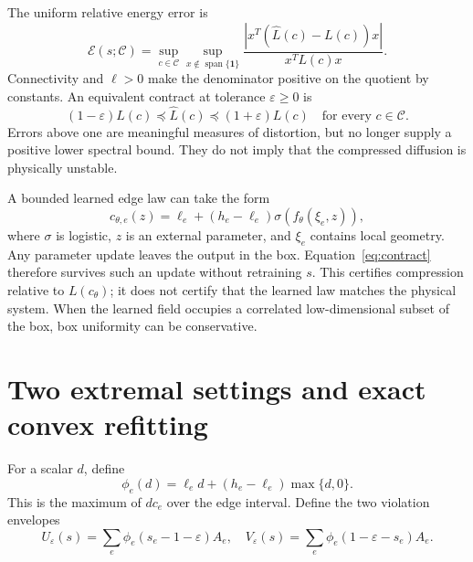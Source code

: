 \documentclass[11pt]{article}
\newcommand{\one}{\mathbf 1}
\newcommand{\eps}{\varepsilon}
\newcommand{\Lo}{\widehat L}
\begin{document}
The uniform relative energy error is
\begin{equation}\label{eq:error}
\mathcal E(s;\mathcal C)=\sup_{c\in\mathcal C}\sup_{x\notin\operatorname{span}\{\one\}}
\frac{|x^T(\Lo(c)-L(c))x|}{x^TL(c)x}.
\end{equation}
Connectivity and $\ell>0$ make the denominator positive on the quotient by constants. An equivalent contract at tolerance $\eps\ge0$ is
\begin{equation}\label{eq:contract}
(1-\eps)L(c)\preceq\Lo(c)\preceq(1+\eps)L(c)
\quad\text{for every }c\in\mathcal C.
\end{equation}
Errors above one are meaningful measures of distortion, but no longer supply a positive lower spectral bound. They do not imply that the compressed diffusion is physically unstable.

A bounded learned edge law can take the form
\begin{equation}\label{eq:learned}
c_{\theta,e}(z)=\ell_e+(h_e-\ell_e)\sigma(f_\theta(\xi_e,z)),
\end{equation}
where $\sigma$ is logistic, $z$ is an external parameter, and $\xi_e$ contains local geometry. Any parameter update leaves the output in the box. Equation~\eqref{eq:contract} therefore survives such an update without retraining $s$. This certifies compression relative to $L(c_\theta)$; it does not certify that the learned law matches the physical system. When the learned field occupies a correlated low-dimensional subset of the box, box uniformity can be conservative.

\section{Two extremal settings and exact convex refitting}
For a scalar $d$, define
\begin{equation}\label{eq:phi}
\phi_e(d)=\ell_ed+(h_e-\ell_e)\max\{d,0\}.
\end{equation}
This is the maximum of $d c_e$ over the edge interval. Define the two violation envelopes
\begin{equation}\label{eq:envelopes}
U_\eps(s)=\sum_e\phi_e(s_e-1-\eps)A_e,
\quad
V_\eps(s)=\sum_e\phi_e(1-\eps-s_e)A_e.
\end{equation}
\end{document}
